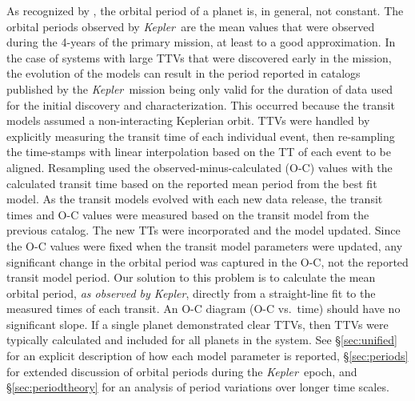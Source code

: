 \documentclass{aastex62}
\newcommand{\ikt}{{\it Kepler}}
\newcommand{\ik}{{\it Kepler~}}
\begin{document}
As recognized by \cite{Newton:1687}, the orbital period of a planet is, in general, not constant.  The orbital periods observed by \ik are the mean values that were observed during the 4-years of the primary mission, at least to a good approximation.  In the case of systems with large TTVs that were discovered early in the mission, the evolution of the models can result in the period reported in catalogs published by the \ik mission being only valid for the duration of data used for the initial discovery and characterization.  This occurred because the transit models assumed a non-interacting Keplerian orbit.  TTVs were handled by explicitly measuring the transit time of each individual event, then re-sampling the time-stamps with linear interpolation based on the TT of each event to be aligned.  Resampling used the observed-minus-calculated (O-C) values with the calculated transit time based on the reported mean period from the best fit model.  As the transit models evolved with each new data release, the transit times and O-C values were measured based on the transit model from the previous catalog. The new TTs were incorporated and the model updated.  Since the O-C values were fixed when the transit model parameters were updated, any significant change in the orbital period was captured in the O-C, not the reported transit model period.  Our solution to this problem is to calculate the mean orbital period, {\it as observed by \ikt}, directly from a straight-line fit to the measured times of each transit.  An O-C diagram (O-C vs.~time) should have no significant slope.  If a single planet demonstrated clear TTVs, then TTVs were typically calculated and included for all planets in the system.  See \S\ref{sec:unified} for an explicit description of how each model parameter is reported, \S\ref{sec:periods} for extended discussion of orbital periods during the \ik epoch, and \S\ref{sec:periodtheory} for an analysis of period variations over longer time scales.
\end{document}
